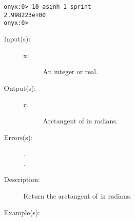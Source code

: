\begin{description}
\begin{description}
\begin{verbatim}
onyx:0> 10 asinh 1 sprint
2.998223e+00
onyx:0>
		\end{verbatim}
	\end{description}
\label{systemdict:atan}
\item[{\onyxop{x}{atan}{r}}: ]
	\begin{description}\item[]
	\item[Input(s): ]
		\begin{description}\item[]
		\item[x: ]
			An integer or real.
		\end{description}
	\item[Output(s): ]
		\begin{description}\item[]
		\item[r: ]
			Arctangent of  in radians.
		\end{description}
	\item[Errors(s): ]
		\begin{description}\item[]
		\item[.]
		\item[.]
		\end{description}
	\item[Description: ]
		Return the arctangent of  in radians.
	\item[Example(s): ]\begin{verbatim}


\end{verbatim}
\end{description}
\end{description}
